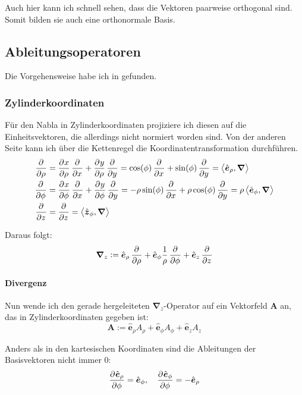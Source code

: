 \documentclass[11pt, ngerman, fleqn]{article}
\newcommand{\ev}{\hat{\vec e}}
\newcommand{\inner}[2]{\left\langle #1, #2 \right\rangle}
\newcommand{\vnabla}{\vec \nabla}
\renewcommand{\vec}[1]{\boldsymbol{#1}}
\begin{document}
Auch hier kann ich schnell sehen, dass die Vektoren paarweise orthogonal sind. Somit bilden sie auch eine orthonormale Basis.

\subsection{Ableitungsoperatoren}

Die Vorgehensweise habe ich in \cite{lautrup-curviliniar} gefunden.

\subsubsection{Zylinderkoordinaten}

Für den Nabla in Zylinderkoordinaten projiziere ich diesen auf die
Einheitsvektoren, die allerdings nicht normiert worden sind. Von der anderen
Seite kann ich über die Kettenregel die Koordinatentransformation durchführen.
\begin{align*}
	\dpd{}\rho &= \dpd x\rho \dpd{}x + \dpd y\rho \dpd{}y = \cos(\phi) \dpd{}x + \sin(\phi) \dpd{}y = \inner{\ev_\rho}\vnabla \\
 \dpd{}\phi &= \dpd x\phi \dpd{}x + \dpd y\phi \dpd{}y= - \rho \sin(\phi) \dpd{}x + \rho \cos(\phi) \dpd{}y = \rho \inner{\ev_\phi}\vnabla \\
	  \dpd{} z &= \dpd{} z = \inner{\hat{\vec z}_\phi}\vnabla
\end{align*}

Daraus folgt:
\[
	\vnabla_z :=
	\ev_\rho
		\dpd{}\rho
	+\ev_\phi
		\frac 1\rho \dpd{}\phi
	+\ev_z
		\dpd{}z
\]

\paragraph{Divergenz}

Nun wende ich den gerade hergeleiteten $\vnabla_z$-Operator auf ein Vektorfeld $\vec A$ an, das in Zylinderkoordinaten gegeben ist:
\[
	\vec A := \ev_\rho A_\rho + \ev_\phi A_\phi + \ev_z A_z
\]

Anders als in den kartesischen Koordinaten sind die Ableitungen der Basisvektoren nicht immer 0:
\[
	\dpd{\ev_\rho}\phi = \ev_\phi
	, \quad
	\dpd{\ev_\phi}\phi = - \ev_\rho
\]
\end{document}
